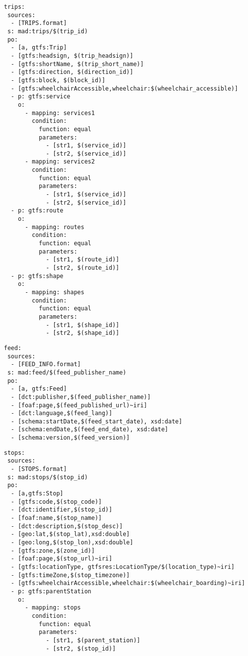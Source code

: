 \begin{lstlisting}[caption=Trips TripleMap, label=lst:trips, basicstyle=\small,frame=single]
trips:
 sources:
  - [TRIPS.format]
 s: mad:trips/$(trip_id)
 po:
  - [a, gtfs:Trip]
  - [gtfs:headsign, $(trip_headsign)]
  - [gtfs:shortName, $(trip_short_name)]
  - [gtfs:direction, $(direction_id)]
  - [gtfs:block, $(block_id)]
  - [gtfs:wheelchairAccessible,wheelchair:$(wheelchair_accessible)]
  - p: gtfs:service
    o:
      - mapping: services1
        condition:
          function: equal
          parameters:
            - [str1, $(service_id)]
            - [str2, $(service_id)]
      - mapping: services2
        condition:
          function: equal
          parameters:
            - [str1, $(service_id)]
            - [str2, $(service_id)]
  - p: gtfs:route
    o:
      - mapping: routes
        condition:
          function: equal
          parameters:
            - [str1, $(route_id)]
            - [str2, $(route_id)]
  - p: gtfs:shape
    o:
      - mapping: shapes
        condition:
          function: equal
          parameters:
            - [str1, $(shape_id)]
            - [str2, $(shape_id)]
\end{lstlisting}

\begin{lstlisting}[caption=Feed\_Info TripleMap, label=lst:feedInfo, basicstyle=\small,frame=single]
feed:
 sources:
  - [FEED_INFO.format]
 s: mad:feed/$(feed_publisher_name)
 po:
  - [a, gtfs:Feed]
  - [dct:publisher,$(feed_publisher_name)]
  - [foaf:page,$(feed_published_url)~iri]
  - [dct:language,$(feed_lang)]
  - [schema:startDate,$(feed_start_date), xsd:date]
  - [schema:endDate,$(feed_end_date), xsd:date]
  - [schema:version,$(feed_version)]
\end{lstlisting}
\begin{lstlisting}[caption=Stops TripleMap, label=lst:stops, basicstyle=\small,frame=single]
stops:
 sources:
  - [STOPS.format]
 s: mad:stops/$(stop_id)
 po:
  - [a,gtfs:Stop]
  - [gtfs:code,$(stop_code)]
  - [dct:identifier,$(stop_id)]
  - [foaf:name,$(stop_name)]
  - [dct:description,$(stop_desc)]
  - [geo:lat,$(stop_lat),xsd:double]
  - [geo:long,$(stop_lon),xsd:double]
  - [gtfs:zone,$(zone_id)]
  - [foaf:page,$(stop_url)~iri]
  - [gtfs:locationType, gtfsres:LocationType/$(location_type)~iri]
  - [gtfs:timeZone,$(stop_timezone)]
  - [gtfs:wheelchairAccessible,wheelchair:$(wheelchair_boarding)~iri]
  - p: gtfs:parentStation
    o:
      - mapping: stops
        condition:
          function: equal
          parameters:
            - [str1, $(parent_station)]
            - [str2, $(stop_id)]
\end{lstlisting}

